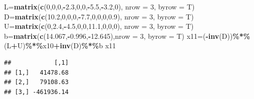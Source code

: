 \documentclass[
]{article}
\newenvironment{Shaded}{\begin{snugshade}}{\end{snugshade}}
\newcommand{\AttributeTok}[1]{\textcolor[rgb]{0.13,0.29,0.53}{#1}}
\newcommand{\DecValTok}[1]{\textcolor[rgb]{0.00,0.00,0.81}{#1}}
\newcommand{\FloatTok}[1]{\textcolor[rgb]{0.00,0.00,0.81}{#1}}
\newcommand{\FunctionTok}[1]{\textcolor[rgb]{0.13,0.29,0.53}{\textbf{#1}}}
\newcommand{\NormalTok}[1]{#1}
\newcommand{\OtherTok}[1]{\textcolor[rgb]{0.56,0.35,0.01}{#1}}
\newcommand{\SpecialCharTok}[1]{\textcolor[rgb]{0.81,0.36,0.00}{\textbf{#1}}}
\begin{document}
\begin{Shaded}
\begin{Highlighting}[]
\NormalTok{  L}\OtherTok{=}\FunctionTok{matrix}\NormalTok{(}\FunctionTok{c}\NormalTok{(}\DecValTok{0}\NormalTok{,}\DecValTok{0}\NormalTok{,}\DecValTok{0}\NormalTok{,}\SpecialCharTok{{-}}\FloatTok{2.3}\NormalTok{,}\DecValTok{0}\NormalTok{,}\DecValTok{0}\NormalTok{,}\SpecialCharTok{{-}}\FloatTok{5.5}\NormalTok{,}\SpecialCharTok{{-}}\FloatTok{3.2}\NormalTok{,}\DecValTok{0}\NormalTok{), }\AttributeTok{nrow =} \DecValTok{3}\NormalTok{, }\AttributeTok{byrow =}\NormalTok{ T)}
\NormalTok{  D}\OtherTok{=}\FunctionTok{matrix}\NormalTok{(}\FunctionTok{c}\NormalTok{(}\FloatTok{10.2}\NormalTok{,}\DecValTok{0}\NormalTok{,}\DecValTok{0}\NormalTok{,}\DecValTok{0}\NormalTok{,}\SpecialCharTok{{-}}\FloatTok{7.7}\NormalTok{,}\DecValTok{0}\NormalTok{,}\DecValTok{0}\NormalTok{,}\DecValTok{0}\NormalTok{,}\FloatTok{0.9}\NormalTok{), }\AttributeTok{nrow =} \DecValTok{3}\NormalTok{, }\AttributeTok{byrow =}\NormalTok{ T)}
\NormalTok{  U}\OtherTok{=}\FunctionTok{matrix}\NormalTok{(}\FunctionTok{c}\NormalTok{(}\DecValTok{0}\NormalTok{,}\FloatTok{2.4}\NormalTok{,}\SpecialCharTok{{-}}\FloatTok{4.5}\NormalTok{,}\DecValTok{0}\NormalTok{,}\DecValTok{0}\NormalTok{,}\FloatTok{11.1}\NormalTok{,}\DecValTok{0}\NormalTok{,}\DecValTok{0}\NormalTok{,}\DecValTok{0}\NormalTok{), }\AttributeTok{nrow =} \DecValTok{3}\NormalTok{, }\AttributeTok{byrow =}\NormalTok{ T)}
\NormalTok{  b}\OtherTok{=}\FunctionTok{matrix}\NormalTok{(}\FunctionTok{c}\NormalTok{(}\FloatTok{14.067}\NormalTok{,}\SpecialCharTok{{-}}\FloatTok{0.996}\NormalTok{,}\SpecialCharTok{{-}}\FloatTok{12.645}\NormalTok{),}\AttributeTok{nrow =} \DecValTok{3}\NormalTok{, }\AttributeTok{byrow =}\NormalTok{ T)}
\NormalTok{  x11}\OtherTok{=}\NormalTok{(}\SpecialCharTok{{-}}\FunctionTok{inv}\NormalTok{(D))}\SpecialCharTok{\%*\%}\NormalTok{(L}\SpecialCharTok{+}\NormalTok{U)}\SpecialCharTok{\%*\%}\NormalTok{x10}\SpecialCharTok{+}\FunctionTok{inv}\NormalTok{(D)}\SpecialCharTok{\%*\%}\NormalTok{b}
\NormalTok{  x11}
\end{Highlighting}
\end{Shaded}

\begin{verbatim}
##            [,1]
## [1,]   41478.68
## [2,]   79108.63
## [3,] -461936.14
\end{verbatim}
\end{document}
